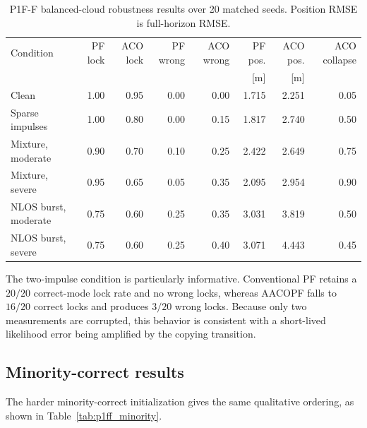 \begin{table}[htbp]
    \centering
    \caption{P1F-F balanced-cloud robustness results over 20 matched seeds. Position RMSE is full-horizon RMSE.}
    \label{tab:p1ff_balanced}
    \begin{tabular}{lrrrrrrr}
        \toprule
        Condition & PF lock & ACO lock & PF wrong & ACO wrong & PF pos. & ACO pos. & ACO collapse\\
        & & & & & [m] & [m] & \\
        \midrule
        Clean                 & 1.00 & 0.95 & 0.00 & 0.00 & 1.715 & 2.251 & 0.05\\
        Sparse impulses       & 1.00 & 0.80 & 0.00 & 0.15 & 1.817 & 2.740 & 0.50\\
        Mixture, moderate     & 0.90 & 0.70 & 0.10 & 0.25 & 2.422 & 2.649 & 0.75\\
        Mixture, severe       & 0.95 & 0.65 & 0.05 & 0.35 & 2.095 & 2.954 & 0.90\\
        NLOS burst, moderate  & 0.75 & 0.60 & 0.25 & 0.35 & 3.031 & 3.819 & 0.50\\
        NLOS burst, severe    & 0.75 & 0.60 & 0.25 & 0.40 & 3.071 & 4.443 & 0.45\\
        \bottomrule
    \end{tabular}
\end{table}

The two-impulse condition is particularly informative. Conventional PF retains a $20/20$ correct-mode lock rate and no wrong locks, whereas AACOPF falls to $16/20$ correct locks and produces $3/20$ wrong locks. Because only two measurements are corrupted, this behavior is consistent with a short-lived likelihood error being amplified by the copying transition.

\subsection{Minority-correct results}
The harder minority-correct initialization gives the same qualitative ordering, as shown in Table~\ref{tab:p1ff_minority}.

